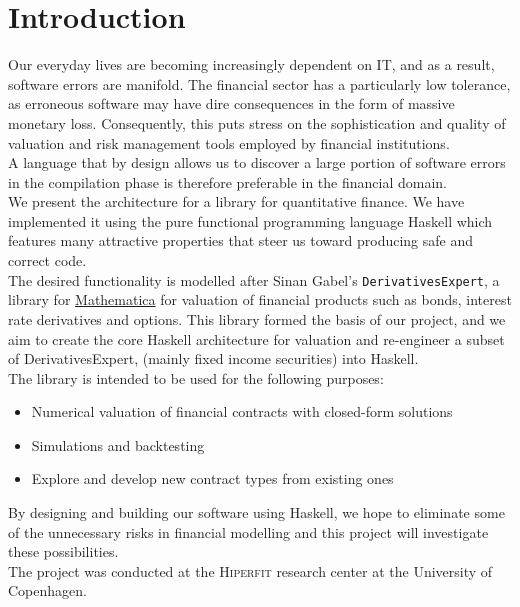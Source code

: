 \chapter{Introduction}

Our everyday lives are becoming increasingly dependent on IT, and as a result,
software errors are manifold. The financial sector has a particularly low 
tolerance, as erroneous software may have dire consequences in the form of
massive monetary loss. Consequently, this puts stress on the sophistication and 
quality of valuation and risk management tools employed by financial institutions.\\
A language that by design allows us to discover a large portion of software
errors in the compilation phase is therefore preferable in the financial domain.\\

We present the architecture for a library for quantitative finance. We have
implemented it using the pure functional programming language Haskell which
features many attractive properties that steer us toward producing safe and
correct code.\\

The desired functionality is modelled after Sinan Gabel's 
\texttt{DerivativesExpert}\cite{Mathematica:DerivativesExpert},
a library for \href{http://www.wolfram.com/mathematica/}{Mathematica}
for valuation of financial products such as bonds, interest rate derivatives 
and options. This library formed the basis of our project, and we aim to create
the core Haskell architecture for valuation and re-engineer a subset of DerivativesExpert, 
(mainly fixed income securities) into Haskell.\\

The library is intended to be used for the following purposes:

\begin{itemize}
\item Numerical valuation of financial contracts with closed-form solutions
\item Simulations and backtesting
\item Explore and develop new contract types from existing ones
\end{itemize}

By designing and building our software using Haskell, we hope to eliminate 
some of the unnecessary risks in financial modelling and this project
will investigate these possibilities.\\

The project was conducted at the \textsc{Hiperfit} research center at the
University of Copenhagen.
